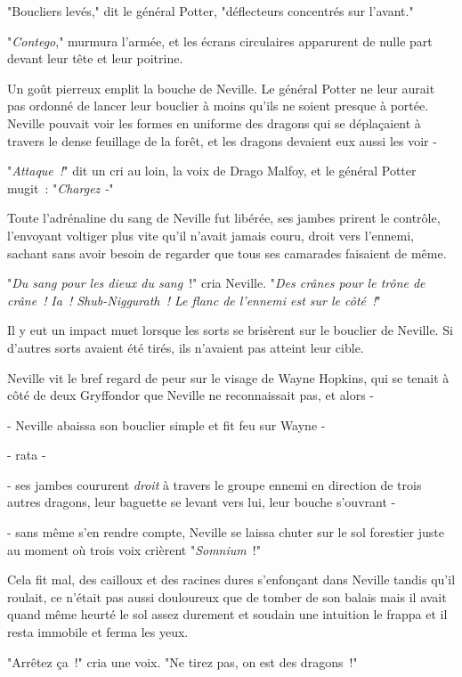 "Boucliers levés," dit le général Potter, "déflecteurs concentrés sur l'avant."

"\emph{Contego}," murmura l'armée, et les écrans circulaires apparurent de nulle part devant leur tête et leur poitrine.

Un goût pierreux emplit la bouche de Neville. Le général Potter ne leur aurait pas ordonné de lancer leur bouclier à moins qu'ils ne soient presque à portée. Neville pouvait voir les formes en uniforme des dragons qui se déplaçaient à travers le dense feuillage de la forêt, et les dragons devaient eux aussi les voir -

"\emph{Attaque~!}" dit un cri au loin, la voix de Drago Malfoy, et le général Potter mugit~: "\emph{Chargez -}"

Toute l'adrénaline du sang de Neville fut libérée, ses jambes prirent le contrôle, l'envoyant voltiger plus vite qu'il n'avait jamais couru, droit vers l'ennemi, sachant sans avoir besoin de regarder que tous ses camarades faisaient de même.

"\emph{Du sang pour les dieux du sang}~!" cria Neville. "\emph{Des crânes pour le trône de crâne~!} \emph{Ia~! Shub-Niggurath~! Le flanc de l'ennemi est sur le côté~!}"

Il y eut un impact muet lorsque les sorts se brisèrent sur le bouclier de Neville. Si d'autres sorts avaient été tirés, ils n'avaient pas atteint leur cible.

Neville vit le bref regard de peur sur le visage de Wayne Hopkins, qui se tenait à côté de deux Gryffondor que Neville ne reconnaissait pas, et alors -

- Neville abaissa son bouclier simple et fit feu sur Wayne -

- rata -

- ses jambes coururent \emph{droit} à travers le groupe ennemi en direction de trois autres dragons, leur baguette se levant vers lui, leur bouche s'ouvrant -

- sans même s'en rendre compte, Neville se laissa chuter sur le sol forestier juste au moment où trois voix crièrent "\emph{Somnium}~!"

Cela fit mal, des cailloux et des racines dures s'enfonçant dans Neville tandis qu'il roulait, ce n'était pas aussi douloureux que de tomber de son balais mais il avait quand même heurté le sol assez durement et soudain une intuition le frappa et il resta immobile et ferma les yeux.

"Arrêtez ça~!" cria une voix. "Ne tirez pas, on est des dragons~!"


